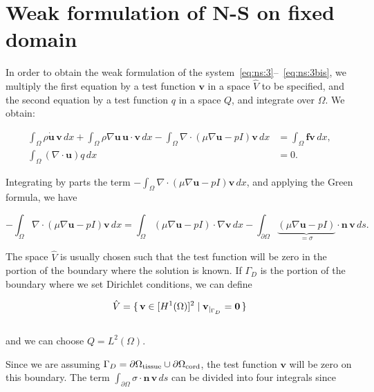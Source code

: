 \documentclass[a4paper,11pt,openright,twoside]{book}
\begin{document}
\section{Weak formulation of N-S on fixed domain}

In order to obtain the weak formulation of the system~\eqref{eq:ns:3}--~\eqref{eq:ns:3bis}, we multiply the first equation by a test function $\mathbf{v}$ in a space $\hat{V}$ to be specified, and the second equation by a test function $q$ in a space $Q$, and integrate over $\Omega$. 
We obtain:

\begin{align}
\label{eq:ns:9}
\int_{\Omega} \rho \dot{\mathbf{u}} \, \mathbf{v} \, dx
+ \int_{\Omega} \rho \nabla \mathbf{u} \, \mathbf{u}   \cdot \mathbf{v} \, dx
- \int_{\Omega} \nabla \cdot (\mu \nabla \mathbf{u} - pI)\mathbf{v} \, dx
&= \int_{\Omega} \mathbf{f} \mathbf{v} \, dx, \\
\int_{\Omega}  (\nabla \cdot \mathbf{u}) q \, dx &= 0.
\end{align}

Integrating by parts the term $- \int_{\Omega} \nabla \cdot (\mu \nabla \mathbf{u} - pI)\mathbf{v} \, dx$, and applying the Green formula, we have

\begin{equation}
\label{eq:green}
- \int_{\Omega} \nabla \cdot (\mu \nabla \mathbf{u} - pI)\mathbf{v} \, dx =  \int_{\Omega} (\mu \nabla \mathbf{u} - pI) \cdot \nabla \mathbf{v} \, dx - \int_{\partial \Omega}  \underbrace{ (\mu \nabla \mathbf{u} - pI)}_{= \sigma} \cdot \mathbf{n} \, \mathbf{v} \, ds.
\end{equation}

The space $\hat{V}$ is usually chosen such that the test function will be zero in the portion of the boundary where the solution is known. If $\Gamma_D$ is the portion of the boundary where we set Dirichlet conditions, we can define

\begin{equation}
\hat{V} = \set{\mathbf{v} \in [H^1(\Omega)]^2 | \mathbf{v}_{|_{\Gamma_D}} = \mathbf{0}} 
\end{equation}
\\
and we can choose $Q = L^2(\Omega)$. 

Since we are assuming $\Gamma_D = \partial  \Omega_{\rm tissue} \cup  \partial \Omega_{\rm cord}$, the test function $\mathbf{v}$ will be zero on this boundary. The term $\int_{\partial \Omega} \sigma \cdot \mathbf{n} \,  \mathbf{v} \, ds$ can be divided into four integrals since
\end{document}
